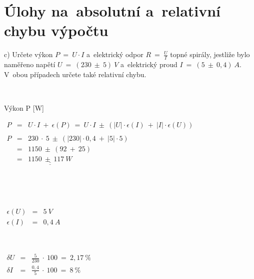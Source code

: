 \documentclass[a4paper,10pt]{article}
\author{Bc. Jan Hladěna}
\def\doubleunderline#1{\underline{\underline{#1}}}
\begin{document}
\pagestyle{fancy}



\section{Úlohy na~absolutní a~relativní chybu výpočtu}

\par c) Určete výkon $P~=~U{\cdot}I$ a~elektrický odpor
$R~=~\frac{U}{I}$ topné spirály, jestliže bylo naměřeno napětí $U~=~(230~{\pm}~5)~V$
a~elektrický proud $I~=~(5~{\pm}~0,4)~A$. V~obou případech určete také relativní chybu.

\par {~}


\par Výkon P [W]

\begin{minipage}[t]{.6\textwidth}

$
\begin{array}{lcl}
P & = & U{\cdot}I~+~\epsilon{(P)}~=~U{\cdot}I~\pm~(|U|{\cdot}{\epsilon}(I)~+~|I|{\cdot}{\epsilon}(U)) \\
\\
P & = & 230~\cdot~5~\pm~(|230|{\cdot}0,4~+~|5|{\cdot}5) \\
  & = & 1150~\pm~(92~+~25) \\
  & = & \doubleunderline{1150~\pm~117~W}
\end{array}
$

\par {~}
\par {~}


\end{minipage}%
\begin{minipage}[t]{.4\textwidth}

$
\begin{array}{lcl}
\epsilon(U) & = & 5~V \\
\epsilon(I) & = & 0,4~A 
\end{array}
$

\par {~}

$
\begin{array}{lcl}
\delta{U} & = & \frac{5}{230}~\cdot~100~=~2,17~\% \\
\delta{I} & = & \frac{0,4}{5}~\cdot~100~=~8~\% 
\end{array}
$

\par {~}

\end{minipage}
\end{document}
